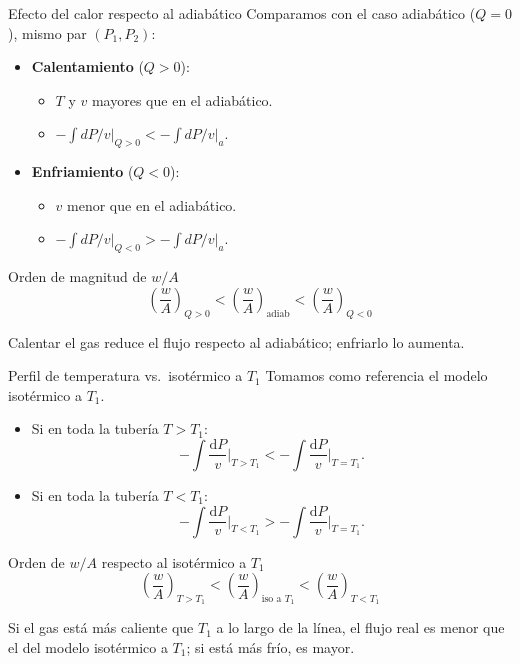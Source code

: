 \documentclass[aspectratio=169]{beamer}
\begin{document}
\begin{frame}{Efecto del calor respecto al adiabático}
Comparamos con el caso adiabático ($Q=0$), mismo par $(P_1,P_2)$:

\begin{itemize}
  \item \textbf{Calentamiento} ($Q>0$):
  \begin{itemize}
    \item $T$ y $v$ mayores que en el adiabático.
    \item $-\displaystyle\int dP/v\big|_{Q>0}
           < -\displaystyle\int dP/v\big|_{a}$.
  \end{itemize}
  \item \textbf{Enfriamiento} ($Q<0$):
  \begin{itemize}
    \item $v$ menor que en el adiabático.
    \item $-\displaystyle\int dP/v\big|_{Q<0}
           > -\displaystyle\int dP/v\big|_{a}$.
  \end{itemize}
\end{itemize}

\pause

\begin{block}{Orden de magnitud de $w/A$}
\[
\boxed{
\left(\frac{w}{A}\right)_{Q>0}
<
\left(\frac{w}{A}\right)_{\text{adiab}}
<
\left(\frac{w}{A}\right)_{Q<0}
}
\]

Calentar el gas reduce el flujo respecto al adiabático; enfriarlo lo aumenta.
\end{block}
\end{frame}


\begin{frame}{Perfil de temperatura vs.\ isotérmico a $T_1$}
Tomamos como referencia el modelo isotérmico a $T_1$.

\begin{itemize}
  \item Si en toda la tubería $T > T_1$:
  \[
    -\int \frac{\mathrm dP}{v}\bigg|_{T>T_1}
    <
    -\int \frac{\mathrm dP}{v}\bigg|_{T=T_1}.
  \]
  \item Si en toda la tubería $T < T_1$:
  \[
    -\int \frac{\mathrm dP}{v}\bigg|_{T<T_1}
    >
    -\int \frac{\mathrm dP}{v}\bigg|_{T=T_1}.
  \]
\end{itemize}

\pause

\begin{block}{Orden de $w/A$ respecto al isotérmico a $T_1$}
\[
\boxed{
\left(\frac{w}{A}\right)_{T>T_1}
<
\left(\frac{w}{A}\right)_{\text{iso a }T_1}
<
\left(\frac{w}{A}\right)_{T<T_1}
}
\]

Si el gas está más caliente que $T_1$ a lo largo de la línea, el flujo real
es menor que el del modelo isotérmico a $T_1$; si está más frío, es mayor.
\end{block}
\end{frame}
\end{document}
